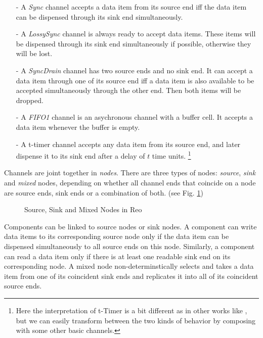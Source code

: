 \documentclass[conference, a4paper]{IEEEtran}
\begin{document}
\begin{itemize}
  \item [-] A \emph{Sync} channel accepts a data item from its source end iff the data item can be
    dispensed through its sink end simultaneously.
  \item [-] A \emph{LossySync} channel is always ready to accept data items. These items will be
    dispensed through its sink end simultaneously if possible, otherwise they will be lost.
  \item [-] A \emph{SyncDrain} channel has two source ends and no sink end. It can accept a data
    item through one of its source end iff a data item is also available to be accepted
    simultaneously through the other end. Then both items will be dropped.
  \item [-] A \emph{FIFO1} channel is an asychronous channel with a buffer cell. It accepts a
    data item whenever the buffer is empty. 
  \item [-] A t-timer channel accepts any data item from its source end, and later dispense it to
    its sink end after a delay of $t$ time units.
    \footnote{
      Here the interpretation of t-Timer is a bit different as in other works like
      \cite{DBLP:conf/sefm/ArbabBBR04, DBLP:conf/tase/Meng12}, but we can easily transform between the
      two kinds of behavior by composing with some other basic channels.
      }
\end{itemize}

Channels are joint together in \emph{nodes}. There are three types of nodes:
\emph{source}, \emph{sink} and \emph{mixed} nodes, depending on whether all channel ends that
coincide on a node are source ends, sink ends or a combination of both.
(see Fig. \ref{fig:node})

\begin{figure}[ht]
  \begin{center}
    
  \end{center}
  \caption{Source, Sink and Mixed Nodes in Reo}
  \label{fig:node}
\end{figure}

Components can be linked to source nodes or sink nodes. A component can write data items to its
corresponding source node only if the data item can be dispensed simultaneously to all source ends
on this node. Similarly, a component can read a data item only if there is at least one readable
sink end on its corresponding node. A mixed node non-determinstically selects and takes a data item
from one of its coincident sink ends and replicates it into all of its coincident source ends.
\end{document}
